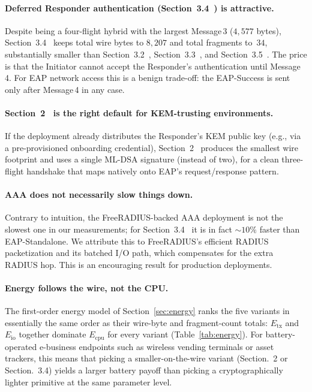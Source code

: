 \documentclass{easychair}
\newcommand{\VarSec}[1]{Section~#1~\cite{pq-edhoc-draft}}
\newcommand{\VarSecShort}[1]{Section.~#1}
\begin{document}
\paragraph{Deferred Responder authentication (\texorpdfstring{\VarSec{3.4}}{Section 3.4}) is attractive.}
Despite being a four-flight hybrid with the largest Message\,3
($4{,}577$ bytes), \VarSec{3.4} keeps total wire bytes to $8{,}207$
and total fragments to~$34$, substantially smaller than \VarSec{3.2},
\VarSec{3.3}, and \VarSec{3.5}. The price is that the Initiator cannot
accept the Responder's authentication until Message\,4. For EAP
network access this is a benign trade-off: the EAP-Success is sent
only after Message\,4 in any case.

\paragraph{\texorpdfstring{\VarSec{2}}{Section 2} is the right default for KEM-trusting environments.}
If the deployment already distributes the Responder's KEM public key
(e.g., via a pre-provisioned onboarding credential), \VarSec{2}
produces the smallest wire footprint and uses a single ML-DSA
signature (instead of two), for a clean three-flight handshake that
maps natively onto EAP's request/response pattern.

\paragraph{AAA does not necessarily slow things down.}
Contrary to intuition, the FreeRADIUS-backed AAA deployment is not the
slowest one in our measurements; for \VarSec{3.4} it is in fact
$\sim\!10\%$ faster than EAP-Standalone. We attribute this to
FreeRADIUS's efficient RADIUS packetization and its batched I/O path,
which compensates for the extra RADIUS hop. This is an encouraging
result for production deployments.

\paragraph{Energy follows the wire, not the CPU.}
The first-order energy model of Section~\ref{sec:energy} ranks the
five variants in essentially the same order as their wire-byte and
fragment-count totals: $E_{\mathrm{tx}}$ and $E_{\mathrm{io}}$
together dominate $E_{\mathrm{cpu}}$ for every variant
(Table~\ref{tab:energy}). For battery-operated e-business endpoints
such as wireless vending terminals or asset trackers, this means
that picking a smaller-on-the-wire variant (\VarSecShort{2} or
\VarSecShort{3.4}) yields a larger battery payoff than picking a
cryptographically lighter primitive at the same parameter level.
\end{document}
